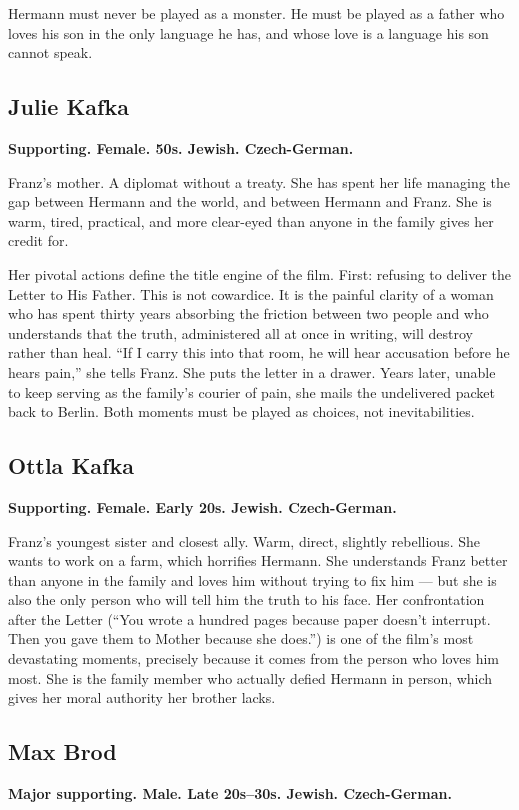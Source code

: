 Hermann must never be played as a monster. He must be played as a father who loves his son in the only language he has, and whose love is a language his son cannot speak.

\subsection{Julie Kafka}
\textbf{Supporting. Female. 50s. Jewish. Czech-German.}

Franz's mother. A diplomat without a treaty. She has spent her life managing the gap between Hermann and the world, and between Hermann and Franz. She is warm, tired, practical, and more clear-eyed than anyone in the family gives her credit for.

Her pivotal actions define the title engine of the film. First: refusing to deliver the Letter to His Father. This is not cowardice. It is the painful clarity of a woman who has spent thirty years absorbing the friction between two people and who understands that the truth, administered all at once in writing, will destroy rather than heal. ``If I carry this into that room, he will hear accusation before he hears pain,'' she tells Franz. She puts the letter in a drawer. Years later, unable to keep serving as the family's courier of pain, she mails the undelivered packet back to Berlin. Both moments must be played as choices, not inevitabilities.

\subsection{Ottla Kafka}
\textbf{Supporting. Female. Early 20s. Jewish. Czech-German.}

Franz's youngest sister and closest ally. Warm, direct, slightly rebellious. She wants to work on a farm, which horrifies Hermann. She understands Franz better than anyone in the family and loves him without trying to fix him --- but she is also the only person who will tell him the truth to his face. Her confrontation after the Letter (``You wrote a hundred pages because paper doesn't interrupt. Then you gave them to Mother because she does.'') is one of the film's most devastating moments, precisely because it comes from the person who loves him most. She is the family member who actually defied Hermann in person, which gives her moral authority her brother lacks.

\subsection{Max Brod}
\textbf{Major supporting. Male. Late 20s--30s. Jewish. Czech-German.}

